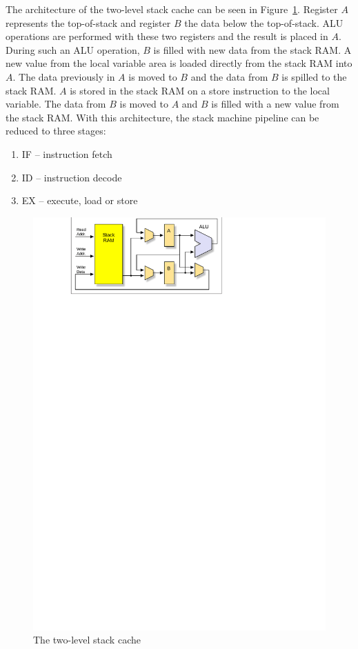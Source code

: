 The architecture of the two-level stack cache can be seen in
Figure~\ref{fig_stack_cache_jop}. Register $A$ represents the
top-of-stack and register $B$ the data below the top-of-stack. ALU
operations are performed with these two registers and the result is
placed in $A$. During such an ALU operation, $B$ is filled with new
data from the stack RAM. A new value from the local variable area is
loaded directly from the stack RAM into $A$. The data previously in
$A$ is moved to $B$ and the data from $B$ is spilled to the stack
RAM. $A$ is stored in the stack RAM on a store instruction to the
local variable. The data from $B$ is moved to $A$ and $B$ is filled
with a new value from the stack RAM.
With this architecture, the stack machine pipeline can be reduced to
three stages:
%
\begin{enumerate}
\item IF -- instruction fetch
\item ID -- instruction decode
\item EX -- execute, load or store
\end{enumerate}


\begin{figure}
    \centering
    \includegraphics[scale=\picscale]{stack/stack_cache_jop}
    \caption{The two-level stack cache}
    \label{fig_stack_cache_jop}
\end{figure}

